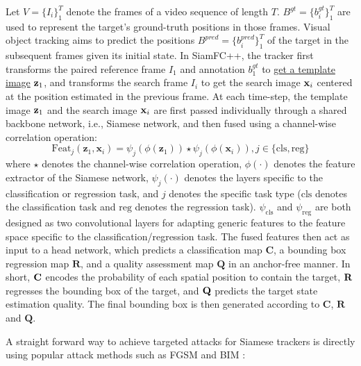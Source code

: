 \documentclass[journal]{IEEEtran}
\newcommand{\ie}{i.e.}
\begin{document}
Let $V=\{I_i\}_1^T$ denote the frames of a video sequence of length $T$. $B^{gt}=\{b^{gt}_i\}_1^T$ are used to represent the target's ground-truth positions in those frames. Visual object tracking aims to predict the positions $B^{pred}=\{b^{pred}_i\}_1^T$ of the target in the subsequent frames given its initial state. In SiamFC++, the tracker first transforms the paired reference frame $I_1$ and annotation $b_1^{gt}$ to \uline{get a template image} $\textbf z_1$, and transforms the search frame $I_i$ to get the search image $\textbf x_i$ centered at the position estimated in the previous frame. At each time-step, the template image $\textbf z_1$ and the search image $\textbf x_i$ are first passed individually through a shared backbone network, \ie, Siamese network, and then fused using a channel-wise correlation operation:
\begin{equation}
  \text{Feat}_{j}(\mathbf{z}_1, \mathbf{x}_i)=\psi_{j}(\phi(\mathbf{z}_1)) \star \psi_{j}(\phi(\mathbf{x}_i)), j \in\{\mathrm{cls}, \mathrm{reg}\}
\end{equation}
where $\star$ denotes the channel-wise correlation operation, $\phi(\cdot)$ denotes the feature extractor of the Siamese network, $\psi_j(\cdot)$ denotes the layers specific to the classification or regression task, and $j$ denotes the specific task type ($\mathrm{cls}$ denotes the classification task and $\mathrm{reg}$ denotes the regression task). $\psi_{\mathrm{cls}}$ and $\psi_{\mathrm{reg}}$ are both designed as two convolutional layers for adapting generic features to the feature space specific to the classification/regression task. The fused features then act as input to a head network, which predicts a classification map $\textbf{C}$, a bounding box regression map $\textbf{R}$, and a quality assessment map $\textbf{Q}$ in an anchor-free manner. In short, $\textbf C$ encodes the probability of each spatial position to contain the target, $\textbf R$ regresses the bounding box of the target, and $\textbf Q$ predicts the target state estimation quality. The final bounding box is then generated according to $\textbf{C}$, $\textbf{R}$ and $\textbf{Q}$.

A straight forward way to achieve targeted attacks for Siamese trackers is directly using popular attack methods such as FGSM \cite{FGSM} and BIM \cite{DBLP:conf/iclr/KurakinGB17a}:
\end{document}
